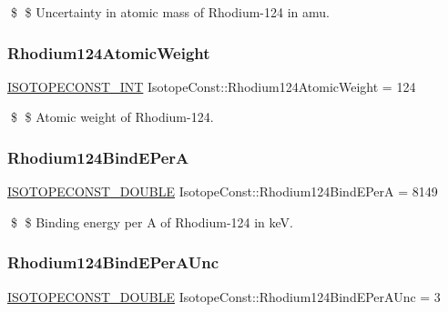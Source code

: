 \$ \$ Uncertainty in atomic mass of Rhodium-\/124 in amu. \mbox{\label{group___isotope_const-_rhodium-_rh124_ga86945674d8e38ea071ba3cedda0400be}} 
\subsubsection{\texorpdfstring{Rhodium124\+Atomic\+Weight}{Rhodium124AtomicWeight}}
{\footnotesize\ttfamily \mbox{\hyperlink{group___isotope_const-_macros_ga5f18360b3e99483a35c32d789e62621c}{I\+S\+O\+T\+O\+P\+E\+C\+O\+N\+S\+T\+\_\+\+I\+NT}} Isotope\+Const\+::\+Rhodium124\+Atomic\+Weight = 124}

\$ \$ Atomic weight of Rhodium-\/124. \mbox{\label{group___isotope_const-_rhodium-_rh124_ga3ca112d1789b73c18c04ba62ebfa8393}} 
\subsubsection{\texorpdfstring{Rhodium124\+Bind\+E\+PerA}{Rhodium124BindEPerA}}
{\footnotesize\ttfamily \mbox{\hyperlink{group___isotope_const-_macros_ga8f45a7272ce02c0b4c65c44636ed719a}{I\+S\+O\+T\+O\+P\+E\+C\+O\+N\+S\+T\+\_\+\+D\+O\+U\+B\+LE}} Isotope\+Const\+::\+Rhodium124\+Bind\+E\+PerA = 8149}

\$ \$ Binding energy per A of Rhodium-\/124 in keV. \mbox{\label{group___isotope_const-_rhodium-_rh124_ga951268d6a31ff05cd052cc0c49993c7b}} 
\subsubsection{\texorpdfstring{Rhodium124\+Bind\+E\+Per\+A\+Unc}{Rhodium124BindEPerAUnc}}
{\footnotesize\ttfamily \mbox{\hyperlink{group___isotope_const-_macros_ga8f45a7272ce02c0b4c65c44636ed719a}{I\+S\+O\+T\+O\+P\+E\+C\+O\+N\+S\+T\+\_\+\+D\+O\+U\+B\+LE}} Isotope\+Const\+::\+Rhodium124\+Bind\+E\+Per\+A\+Unc = 3}

